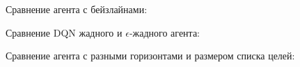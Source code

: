 \documentclass[a4paper]{article}
\begin{document}
Сравнение агента с бейзлайнами:


Сравнение DQN жадного и $\epsilon$-жадного агента:


Сравнение агента с разными горизонтами и размером списка целей:

  

  

  








  
\end{document}

